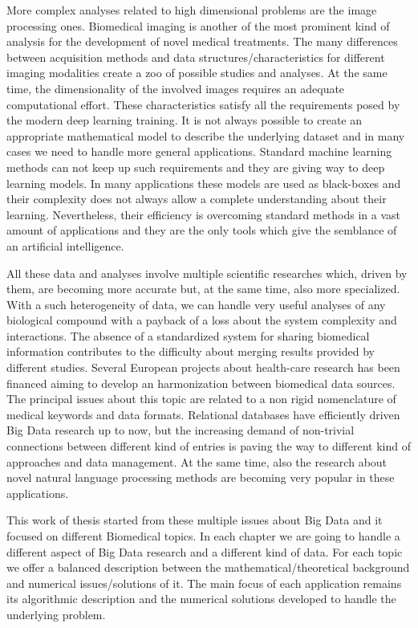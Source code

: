 \documentclass{standalone}
\begin{document}
More complex analyses related to high dimensional problems are the image processing ones.
Biomedical imaging is another of the most prominent kind of analysis for the development of novel medical treatments.
The many differences between acquisition methods and data structures/characteristics for different imaging modalities create a zoo of possible studies and analyses.
At the same time, the dimensionality of the involved images requires an adequate computational effort.
These characteristics satisfy all the requirements posed by the modern deep learning training.
It is not always possible to create an appropriate mathematical model to describe the underlying dataset and in many cases we need to handle more general applications.
Standard machine learning methods can not keep up such requirements and they are giving way to deep learning models.
In many applications these models are used as black-boxes and their complexity does not always allow a complete understanding about their learning.
Nevertheless, their efficiency is overcoming standard methods in a vast amount of applications and they are the only tools which give the semblance of an artificial intelligence.

All these data and analyses involve multiple scientific researches which, driven by them, are becoming more accurate but, at the same time, also more specialized.
With a such heterogeneity of data, we can handle very useful analyses of any biological compound with a payback of a loss about the system complexity and interactions.
The absence of a standardized system for sharing biomedical information contributes to the difficulty about merging results provided by different studies.
Several European projects about health-care research has been financed aiming to develop an harmonization between biomedical data sources.
The principal issues about this topic are related to a non rigid nomenclature of medical keywords and data formats.
Relational databases have efficiently driven Big Data research up to now, but the increasing demand of non-trivial connections between different kind of entries is paving the way to different kind of approaches and data management.
At the same time, also the research about novel natural language processing methods are becoming very popular in these applications.

This work of thesis started from these multiple issues about Big Data and it focused on different Biomedical topics.
In each chapter we are going to handle a different aspect of Big Data research and a different kind of data.
For each topic we offer a balanced description between the mathematical/theoretical background and numerical issues/solutions of it.
The main focus of each application remains its algorithmic description and the numerical solutions developed to handle the underlying problem.
\end{document}

